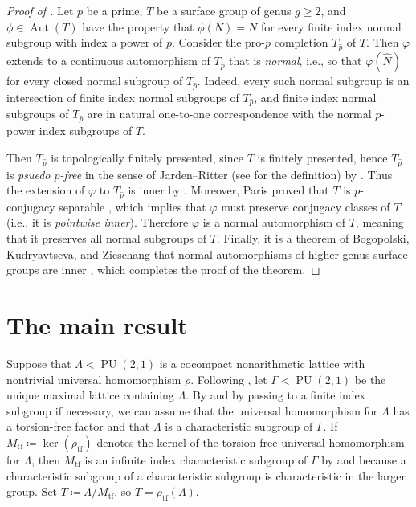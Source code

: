 \documentclass[11pt]{article}
\theoremstyle{plain}
\theoremstyle{definition}
\theoremstyle{remark}
\newcommand{\Gam}{\Gamma}
\newcommand{\Lam}{\Lambda}
\DeclareMathOperator{\PU}{PU}
\DeclareMathOperator{\Aut}{Aut}
\newcommand{\wh}{\widehat}
\newenvironment{pf}{\begin{proof}}{\end{proof}}
\begin{document}
\begin{pf}[Proof of ]
Let $p$ be a prime, $T$ be a surface group of genus $g \ge2$, and $\phi \in \Aut(T)$ have the property that $\phi(N) = N$ for every finite index normal subgroup with index a power of $p$. Consider the pro-$p$ completion $T_{\wh{p}}$ of $T$. Then $\varphi$ extends to a continuous automorphism of $T_{\wh{p}}$ that is \emph{normal}, i.e., so that $\varphi(\wh{N})$ for every closed normal subgroup of $T_{\wh{p}}$. Indeed, every such normal subgroup is an intersection of finite index normal subgroups of $T_{\wh{p}}$, and finite index normal subgroups of $T_{\wh{p}}$ are in natural one-to-one correspondence with the normal $p$-power index subgroups of $T$.

Then $T_{\wh{p}}$ is topologically finitely presented, since $T$ is finitely presented, hence $T_{\wh{p}}$ is \emph{psuedo $p$-free} in the sense of Jarden--Ritter (see \cite[\S 1]{JardenRitter} for the definition) by \cite[Thm. 4]{JardenRitter}. Thus the extension of $\varphi$ to $T_{\wh{p}}$ is inner by \cite[Thm.\ 1]{JardenRitter}. Moreover, Paris proved that $T$ is $p$-conjugacy separable \cite[Thm.\ 1.7]{Paris}, which implies that $\varphi$ must preserve conjugacy classes of $T$ (i.e., it is \emph{pointwise inner}). Therefore $\varphi$ is a normal automorphism of $T$, meaning that it preserves all normal subgroups of $T$. Finally, it is a theorem of Bogopolski, Kudryavtseva, and Zieschang that normal automorphisms of higher-genus surface groups are inner \cite[Thm.\ 1.3]{BKZ}, which completes the proof of the theorem.
\end{pf}

\section{The main result}\label{sec:Main}

Suppose that $\Lam < \PU(2,1)$ is a cocompact nonarithmetic lattice with nontrivial universal homomorphism $\rho$. Following , let $\Gam < \PU(2,1)$ be the unique maximal lattice containing $\Lam$. By  and by passing to a finite index subgroup if necessary, we can assume that the universal homomorphism for $\Lam$ has a torsion-free factor and that $\Lam$ is a characteristic subgroup of $\Gam$. If $M_{\mathrm{tf}} \coloneqq \ker(\rho_{\mathrm{tf}})$ denotes the kernel of the torsion-free universal homomorphism for $\Lam$, then $M_{\mathrm{tf}}$ is an infinite index characteristic subgroup of $\Gam$ by  and because a characteristic subgroup of a characteristic subgroup is characteristic in the larger group. Set $T \coloneqq \Lam / M_{\mathrm{tf}}$, so $T = \rho_{\mathrm{tf}}(\Lam)$.
\end{document}
